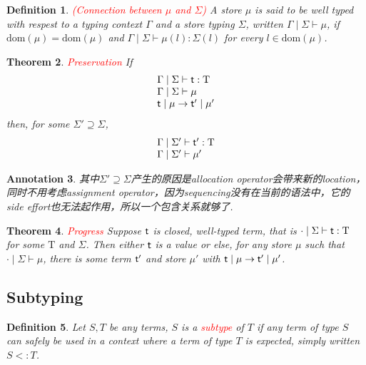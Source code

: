 \documentclass{article}
\theoremstyle{plain}
\newtheorem{theorem}{Theorem}
\newtheorem{definition}[theorem]{Definition}
\newtheorem{annotation}[theorem]{Annotation}
\theoremstyle{nonumberplain}
\newcommand{\singletype}[1]{\text{#1}}
\newcommand{\termtype}[2]{\ensuremath{#1:#2}}
\newcommand{\term}[1]{\ensuremath\mathsf{#1}}
\newcommand{\subtyp}[2]{#1<:#2}
\newcommand{\redt}[1]{\textcolor{red}{#1}}
\begin{document}
\begin{definition}
\rm \redt{(Connection between $\mu$ and $\Sigma$)} A store $\mu$ is said to be well typed with respest to a typing context $\Gamma$ and a store typing $\Sigma$, written $\Gamma \mid \Sigma \vdash \mu$, if $\text{dom}(\mu) = \text{dom}(\mu)$ and $\Gamma \mid \Sigma \vdash \termtype{\mu({l})}{\Sigma(l)}$ for every $l \in \text{dom}(\mu)$. 
\end{definition}

\begin{theorem}
\rm \redt{Preservation} If 
$$
\begin{array}{lll}
\Gamma \mid \Sigma \vdash \termtype{\term{t}}{\singletype{T}} \\
\Gamma \mid \Sigma \vdash \mu  \\
\term{t} \mid \mu \to \term{t}' \mid \mu' 
\end{array}
$$
then, for some $\Sigma' \supseteq \Sigma$,
$$
\begin{array}{ll}
\Gamma \mid \Sigma' \vdash \termtype{\term{t}'}{\singletype{T}} \\
\Gamma \mid \Sigma' \vdash \mu'
\end{array}
$$
\end{theorem}

\begin{annotation}
\rm 其中$\Sigma' \supseteq \Sigma$产生的原因是allocation operator会带来新的location，同时不用考虑assignment operator，因为sequencing没有在当前的语法中，它的side effort也无法起作用，所以一个包含关系就够了. 
\end{annotation}


\begin{theorem}
\rm \redt{Progress} Suppose $\term{t}$ is closed, well-typed term, that is $\cdot \mid \Sigma \vdash \termtype{\term{t}}{\singletype{T}}$ for some $\singletype{T}$ and $\Sigma$. Then either $\term{t}$ is a value or else, for any store $\mu$ such that $\cdot \mid \Sigma \vdash \mu$, there is some term $\term{t}'$ and store $\mu'$ with $\term{t} \mid \mu \to \term{t}' \mid \mu'$.
\end{theorem}


\newpage
\subsection{Subtyping}

\begin{definition}
\rm Let $S,T$ be any terms, $S$ is a \redt{subtype} of $T$ if any term of type $S$ can safely be used in a context where a term of type $T$ is expected, simply written $\subtyp{S}{T}$. 
\end{definition}
\end{document}
